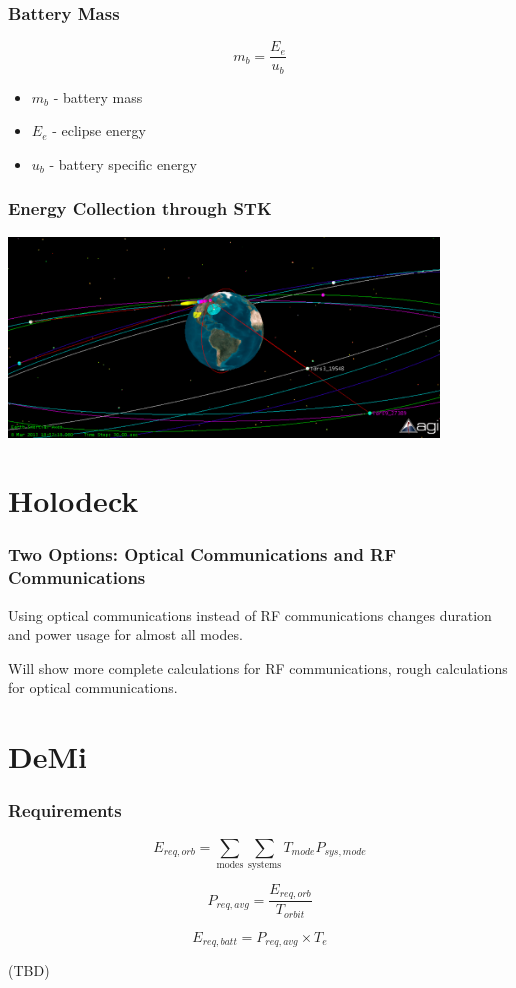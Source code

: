 \documentclass{beamer}
\begin{document}
\begin{frame}
  \frametitle{Battery Mass}
  \[m_b = \frac{E_e}{u_b}\]

  \begin{itemize}
    \item $m_b$ - battery mass
    \item $E_e$ - eclipse energy
    \item $u_b$ - battery specific energy
  \end{itemize}
\end{frame}

\begin{frame}
  \frametitle{Energy Collection through STK}
  \begin{center}
    \includegraphics[width=4.5in]{img/stk}
  \end{center}
\end{frame}

\section{Holodeck}
\begin{frame}
  \frametitle{Two Options: Optical Communications and RF Communications}
  \begin{center}
    Using optical communications instead of RF communications changes
    duration and power usage for almost all modes.

    Will show more complete calculations for RF communications, rough
    calculations for optical communications.
  \end{center}
\end{frame}

\section{DeMi}

\begin{frame}
	\frametitle{Requirements}

		
	\[ E_{req,orb} = \sum_\text{modes}{\sum_\text{systems}{T_{mode}P_{sys,mode}}} \]
	
	\[  P_{req,avg} = \frac{E_{req,orb}}{T_{orbit}} \]
	
	\[ E_{req,batt} = P_{req,avg} \times T_e\]
	
	(TBD)
	
\end{frame}
\end{document}
